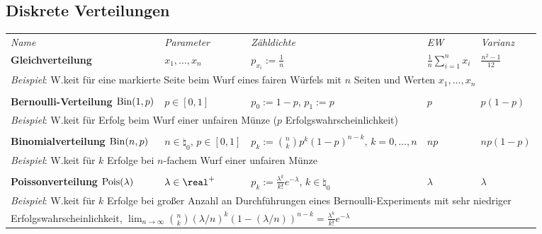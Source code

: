 \pagebreak

\begin{landscape}
\section{%
    Diskrete Verteilungen%
}

\begin{tabular}{p{85mm}p{40mm}p{65mm}p{20mm}p{27mm}}
    \toprule
    \emph{Name} & \emph{Parameter} & \emph{Zähldichte} & \emph{EW} & \emph{Varianz}\\

    \addlinespace[5mm]
    \midrule
    \textbf{Gleichverteilung} &
    $x_1, \dotsc, x_n$ &
    $p_{x_i} := \frac{1}{n}$ &
    $\frac{1}{n} \sum_{i=1}^n x_i$ &
    $\frac{n^2 - 1}{12}$\\
    \multicolumn{5}{l}{\emph{Beispiel}:
    W.keit für eine markierte Seite beim Wurf eines fairen Würfels mit $n$ Seiten und
    Werten $x_1, \dotsc, x_n$}\\
    \multicolumn{5}{l}{}\\

    \addlinespace[5mm]
    \midrule
    \textbf{Bernoulli-Verteilung $\operatorname{Bin}(1, p)$} &
    $p \in [0, 1]$ &
    $p_0 := 1-p$, $p_1 := p$ &
    $p$ &
    $p(1-p)$\\
    \multicolumn{5}{l}{\emph{Beispiel}:
    W.keit für Erfolg beim Wurf einer unfairen Münze ($p$ Erfolgswahrscheinlichkeit)}\\
    \multicolumn{5}{l}{}\\

    \addlinespace[5mm]
    \midrule
    \textbf{Binomialverteilung $\operatorname{Bin}(n, p)$} &
    $n \in \natural_0$, $p \in [0, 1]$ &
    $p_k := \binom{n}{k} p^k (1-p)^{n-k}$, $k = 0, \dotsc, n$ &
    $np$ &
    $np(1-p)$\\
    \multicolumn{5}{l}{\emph{Beispiel}:
    W.keit für $k$ Erfolge bei $n$-fachem Wurf einer unfairen Münze}\\
    \multicolumn{5}{l}{}\\

    \addlinespace[5mm]
    \midrule
    \textbf{Poissonverteilung $\operatorname{Pois}(\lambda)$} &
    $\lambda \in \real^+$ &
    $p_k := \frac{\lambda^k}{k!} e^{-\lambda}$, $k \in \natural_0$ &
    $\lambda$ &
    $\lambda$\\
    \multicolumn{5}{l}{\emph{Beispiel}:
    W.keit für $k$ Erfolge bei großer Anzahl an Durchführungen eines
    Bernoulli-Experiments mit sehr niedriger}\\
    \multicolumn{5}{l}{Erfolgswahrscheinlichkeit, $\lim_{n \to \infty}
    \binom{n}{k} (\lambda/n)^k (1-(\lambda/n))^{n-k} = \frac{\lambda^k}{k!} e^{-\lambda}$}
    \\


\end{tabular}
\end{landscape}
